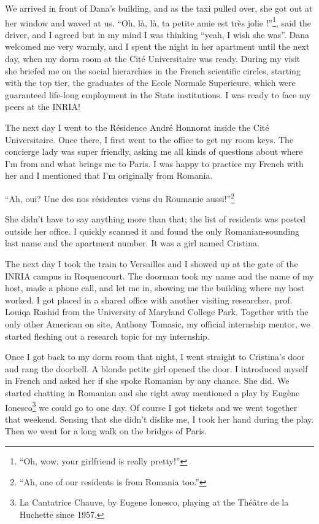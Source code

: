 \documentclass[12pt]{book}
\begin{document}
We arrived in front of Dana's building, and as the taxi pulled over, she
got out at her window and waved at us. ``Oh, là, là, ta petite amie est
très jolie !''\footnote{
  ``Oh, wow, your girlfriend is really pretty!''}, said the driver, and
I agreed but in my mind I was thinking ``yeah, I wish she was''. Dana
welcomed me very warmly, and I spent the night in her apartment until
the next day, when my dorm room at the Cité Universitaire was ready.
During my visit she briefed me on the social hierarchies in the French
scientific circles, starting with the top tier, the graduates of the
Ecole Normale Superieure, which were guaranteed life-long employment in
the State institutions. I was ready to face my peers at the INRIA!

The next day I went to the Résidence André Honnorat inside the Cité
Universitaire. Once there, I first went to the office to get my room
keys. The concierge lady was super friendly, asking me all kinds of
questions about where I'm from and what brings me to Paris. I was happy
to practice my French with her and I mentioned that I'm originally from
Romania.

``Ah, oui? Une des nos résidentes viens du Roumanie
aussi!''\footnote{
  ``Ah, one of our residents is from Romania too.''}

She didn't have to say anything more than that; the list of residents
was posted outside her office. I quickly scanned it and found the only
Romanian-sounding last name and the apartment number. It was a girl
named Cristina.

The next day I took the train to Versailles and I showed up at the gate
of the INRIA campus in Roquencourt. The doorman took my name and the
name of my host, made a phone call, and let me in, showing me the
building where my host worked. I got placed in a shared office with
another visiting researcher, prof. Louiqa Rashid from the University of
Maryland College Park. Together with the only other American on site,
Anthony Tomasic, my official internship mentor, we started fleshing out
a research topic for my internship.

Once I got back to my dorm room that night, I went straight to
Cristina's door and rang the doorbell. A blonde petite girl opened the
door. I introduced myself in French and asked her if she spoke Romanian
by any chance. She did. We started chatting in Romanian and she right
away mentioned a play by Eugène Ionesco\footnote{
  La Cantatrice Chauve, by Eugene Ionesco, playing at the Théâtre de la
  Huchette since 1957.} we could go to one day. Of course I got tickets
and we went together that weekend. Sensing that she didn't dislike me, I
took her hand during the play. Then we went for a long walk on the
bridges of Paris.
\end{document}
